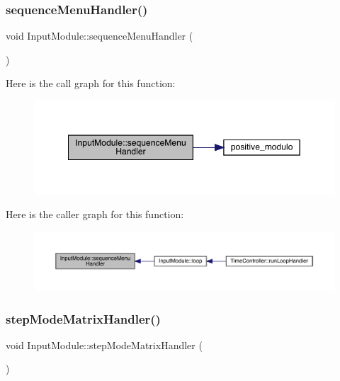 \subsubsection{\texorpdfstring{sequence\+Menu\+Handler()}{sequenceMenuHandler()}}
{\footnotesize\ttfamily void Input\+Module\+::sequence\+Menu\+Handler (\begin{DoxyParamCaption}{ }\end{DoxyParamCaption})}

Here is the call graph for this function\+:
\nopagebreak
\begin{figure}[H]
\begin{center}
\leavevmode
\includegraphics[width=349pt]{class_input_module_a6b0c9027e4088393722d00d162e4ecd9_cgraph}
\end{center}
\end{figure}
Here is the caller graph for this function\+:
\nopagebreak
\begin{figure}[H]
\begin{center}
\leavevmode
\includegraphics[width=350pt]{class_input_module_a6b0c9027e4088393722d00d162e4ecd9_icgraph}
\end{center}
\end{figure}
\mbox{\label{class_input_module_ada290dc92f0ad59826c47781ea2209c0}} 
\subsubsection{\texorpdfstring{step\+Mode\+Matrix\+Handler()}{stepModeMatrixHandler()}}
{\footnotesize\ttfamily void Input\+Module\+::step\+Mode\+Matrix\+Handler (\begin{DoxyParamCaption}{ }\end{DoxyParamCaption})}

